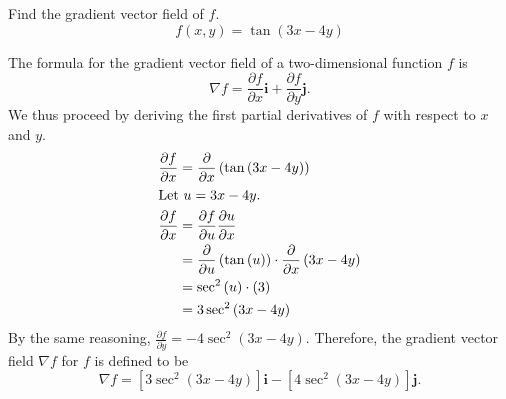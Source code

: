 \begin{exercise}
	Find the gradient vector field of $f$.
	\begin{equation*}
	f\left(x,y\right)=\tan\left(3x-4y\right)
	\end{equation*}
\end{exercise}
\begin{solution}
	The formula for the gradient vector field of a two-dimensional function $f$ is
	\begin{equation*}
	\nabla f = \frac{\partial f}{\partial x}\mathbf{i} + \frac{\partial f}{\partial y}\mathbf{j}.
	\end{equation*}
	We thus proceed by deriving the first partial derivatives of $f$ with respect to $x$ and $y$.
	\begin{align*}
	\frac{\partial f}{\partial x} &= \frac{\partial}{\partial x}\left( \tan \left(3x-4y\right)\right) \\
	\intertext{Let $u = 3x-4y$.}
	\frac{\partial f}{\partial x} &= \frac{\partial f}{\partial u} \frac{\partial u}{\partial x} \\
	&= \frac{\partial}{\partial u}\left( \tan\left(u\right) \right) \cdot \frac{\partial}{\partial x}\left( 3x-4y \right) \\
	&= \sec^2\left( u \right) \cdot \left( 3 \right) \\
	&= 3\sec^2\left( 3x-4y \right)
	\end{align*}
	By the same reasoning, $\frac{\partial f}{\partial y} = -4\sec^2\left(3x-4y\right)$. Therefore, the gradient vector field $\nabla f$ for $f$ is defined to be
	\begin{equation*}
	\nabla f = \left[ 3\sec^2\left(3x-4y\right) \right]\mathbf{i} - \left[ 4\sec^2\left(3x-4y\right) \right]\mathbf{j}.
	\end{equation*}
\end{solution}

